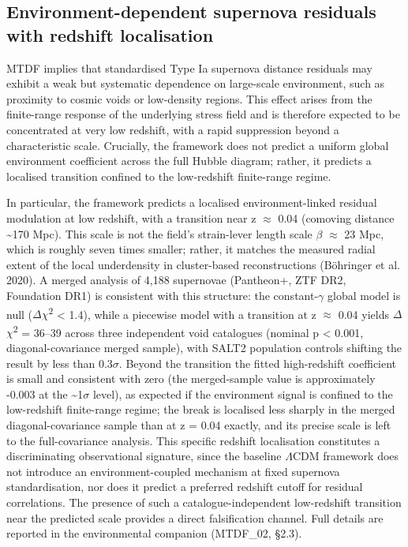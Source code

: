 \documentclass[11pt,a4paper]{article}
\begin{document}
\subsection{Environment-dependent supernova residuals with redshift localisation}
MTDF implies that standardised Type Ia supernova distance residuals may exhibit a weak but systematic dependence on large-scale environment, such as proximity to cosmic voids or low-density regions. This effect arises from the finite-range response of the underlying stress field and is therefore expected to be concentrated at very low redshift, with a rapid suppression beyond a characteristic scale. Crucially, the framework does not predict a uniform global environment coefficient across the full Hubble diagram; rather, it predicts a localised transition confined to the low-redshift finite-range regime.

In particular, the framework predicts a localised environment-linked residual modulation at low redshift, with a transition near z $\approx$ 0.04 (comoving distance \~{}170 Mpc). This scale is not the field's strain-lever length scale $\beta$ $\approx$ 23 Mpc, which is roughly seven times smaller; rather, it matches the measured radial extent of the local underdensity in cluster-based reconstructions (B\"ohringer et al. 2020). A merged analysis of 4,188 supernovae (Pantheon+, ZTF DR2, Foundation DR1) is consistent with this structure: the constant-$\gamma$ global model is null ($\Delta$$\chi$\textsuperscript{2} < 1.4), while a piecewise model with a transition at z $\approx$ 0.04 yields $\Delta$$\chi$\textsuperscript{2} = 36--39 across three independent void catalogues (nominal p < 0.001, diagonal-covariance merged sample), with SALT2 population controls shifting the result by less than 0.3$\sigma$. Beyond the transition the fitted high-redshift coefficient is small and consistent with zero (the merged-sample value is approximately -0.003 at the \~{}1$\sigma$ level), as expected if the environment signal is confined to the low-redshift finite-range regime; the break is localised less sharply in the merged diagonal-covariance sample than at z = 0.04 exactly, and its precise scale is left to the full-covariance analysis. This specific redshift localisation constitutes a discriminating observational signature, since the baseline $\Lambda$CDM framework does not introduce an environment-coupled mechanism at fixed supernova standardisation, nor does it predict a preferred redshift cutoff for residual correlations. The presence of such a catalogue-independent low-redshift transition near the predicted scale provides a direct falsification channel. Full details are reported in the environmental companion (MTDF\_\allowbreak{}02, \S{}2.3).
\end{document}
